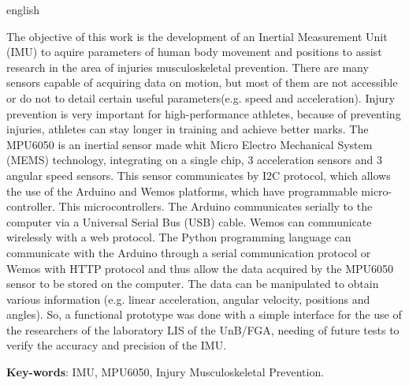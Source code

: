 \begin{resumo}[Abstract]
 \begin{otherlanguage*}{english}
 	
 	The objective of this work is the development of an Inertial Measurement Unit (IMU) to aquire parameters of human body movement and positions to assist research in the area of injuries musculoskeletal prevention. There are many sensors capable of acquiring data on motion, but most of them are not accessible or do not to detail certain useful parameters(e.g. speed and acceleration). Injury prevention is very important for high-performance athletes, because of preventing injuries, athletes can stay longer in training and achieve better marks. The MPU6050 is an inertial sensor made whit Micro Electro Mechanical System (MEMS) technology, integrating on a single chip, 3 acceleration sensors and 3 angular speed sensors. This sensor communicates by I2C protocol, which allows the use of the Arduino and Wemos platforms, which have programmable micro-controller. This microcontrollers. The Arduino communicates serially to the computer via a Universal  Serial Bus (USB) cable. Wemos can communicate wirelessly with a web protocol. The Python programming language can communicate with the Arduino through a serial communication protocol or Wemos with HTTP protocol and thus allow the data acquired by the MPU6050 sensor to be stored on the computer. The data can be manipulated to obtain various information (e.g. linear acceleration, angular velocity, positions and angles). So, a functional prototype was done with a simple interface for the use of the researchers of the laboratory LIS of the UnB/FGA, needing of future tests to verify the accuracy and precision of the IMU.

   \vspace{\onelineskip}
 
   \noindent 
   \textbf{Key-words}: IMU, MPU6050, Injury Musculoskeletal Prevention.
 \end{otherlanguage*}
\end{resumo}

